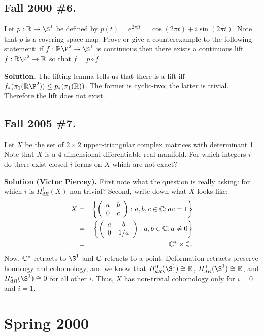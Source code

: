 \documentclass[10pt]{article}
\numberwithin{equation}{subsection}
\begin{document}
\subsection{Fall 2000 \#6.}

Let $p:\R\to\S^1$ be defined by $p(t)=e^{2\pi i t} = \cos(2\pi t) + i \sin(2\pi
t)$.  Note that $p$ is a covering space map.  Prove or give a counterexample to
the following statement:  if $f:\R\P^2\to \S^1$ is continuous then there exists
a continuous lift $\tilde f:\R\P^2 \to \R$ so that $f=p\circ \tilde f$.

\textbf{Solution.}  The lifting lemma tells us that there is a lift iff
$f_*(\pi_1(\R\P^2)) \le p_*(\pi_1(\R))$.  The former is cyclic-two; the latter
is trivial.  Therefore the lift does not exist.

\subsection{Fall 2005 \#7.}

Let $X$ be the set of $2 \times 2$ upper-triangular complex matrices with
determinant 1.  Note that $X$ is a 4-dimensional dfferentiable real manifold.
For which integers $i$ do there exist closed $i$ forms on $X$ which are not
exact?

\textbf{Solution (Victor Piercey).}  First note what the question is really
asking:  for which $i$ is $H^i_{dR}(X)$ non-trivial?  Second, write down
what $X$ looks like:
\begin{eqnarray*}
	X &=& \left\{ \left(\begin{array}{cccccccccccc} a & b \\ 0 & c \end{array}\right) : a,b,c\in \mathbb{C}; ac=1 \right\} \\
	&=& \left\{ \left(\begin{array}{cccccccccccc} a & b \\ 0 & 1/a \end{array}\right) : a,b \in \mathbb{C}; a \ne 0 \right\} \\
	&=& \mathbb{C}^* \times \mathbb{C}.
\end{eqnarray*}
Now, $\mathbb{C}^*$ retracts to $\S^1$ and $\mathbb{C}$ retracts to a point.  Deformation
retracts preserve homology and cohomology, and we know that
$H^0_{dR}(\S^1)\cong \R$, $H^1_{dR}(\S^1)\cong \R$, and $H^i_{dR}(\S^1)\cong 0$
for all other $i$.  Thus, $X$ has non-trivial cohomology only for
$i=0$ and $i=1$.

\newpage
\section{Spring 2000}
\end{document}
